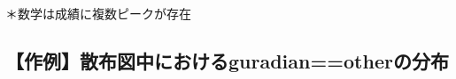 \documentclass[9pt]{ltjsarticle}
\begin{document}
    \begin{center}
    \end{center}
    { \hspace*{\fill} \\}
    
    ＊数学は成績に複数ピークが存在

    \hypertarget{ux4f5cux4f8bux6563ux5e03ux56f3ux4e2dux306bux304aux3051ux308bguradianotherux306eux5206ux5e03}{%
\subsection{【作例】散布図中におけるguradian==otherの分布}\label{ux4f5cux4f8bux6563ux5e03ux56f3ux4e2dux306bux304aux3051ux308bguradianotherux306eux5206ux5e03}}
\end{document}
